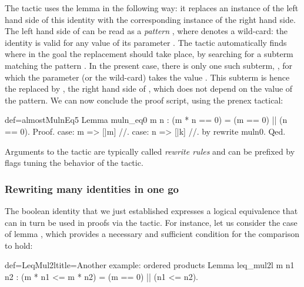The  tactic uses the  lemma in the following way:
it replaces an instance of the left hand side of this identity with the
corresponding instance of the right hand side. The left hand side of
 can be read as a \emph{pattern} , where \C{_}
denotes a wild-card: the identity is
valid for any value of its parameter . The tactic
automatically  finds  where in the goal the replacement should take
place, by searching for a subterm matching the pattern .
In the present case, there is only one such subterm,
, for which the parameter (or the wild-card) takes the
value . This subterm is hence the replaced by , the right
hand side of , which does not depend on the value of the
pattern. We can now conclude the proof script, using the
prenex  tactical:

\begin{coq}{def=almostMulnEq5}{}
Lemma muln_eq0 m n : (m * n == 0) = (m == 0) || (n == 0).
Proof.
case: m => [|m] //.
case: n => [|k] //.
by rewrite muln0.
Qed.
\end{coq}

Arguments to the  tactic are typically called
\emph{rewrite rules} and can
be prefixed by flags tuning the behavior of the tactic.


\subsubsection{Rewriting many identities in one go}
\label{sec:multirew}

The boolean identity  that we just established expresses a
logical equivalence that can in turn be used in proofs via the
 tactic. For instance, let us consider the case of lemma
, which provides a necessary and sufficient condition
for the comparison  to hold:

\begin{coq}{def=LeqMul2l}{title=Another example: ordered products}
Lemma leq_mul2l m n1 n2 : (m * n1 <= m * n2) = (m == 0) || (n1 <= n2).
\end{coq}

